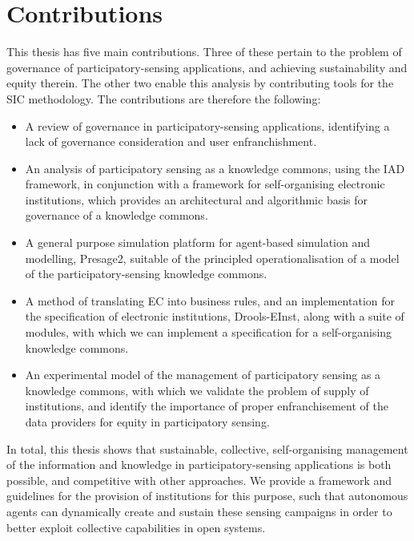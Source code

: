 \section{Contributions}

This thesis has five main contributions. Three of these pertain to the problem of governance of participatory-sensing applications, and achieving sustainability and equity therein. The other two enable this analysis by contributing tools for the \ac{SIC} methodology. The contributions are therefore the following:

\begin{itemize}
\item A review of governance in participatory-sensing applications, identifying a lack of governance consideration and user enfranchishment.
\item An analysis of participatory sensing as a knowledge commons, using the \ac{IAD} framework, in conjunction with a framework for self-organising electronic institutions, which provides an architectural and algorithmic basis for governance of a knowledge commons.
\item A general purpose simulation platform for agent-based simulation and modelling, Presage2, suitable of the principled operationalisation of a model of the participatory-sensing knowledge commons.
\item A method of translating \acl{EC} into business rules, and an implementation for the specification of electronic institutions, Drools-EInst, along with a suite of modules, with which we can implement a specification for a self-organising knowledge commons.
\item An experimental model of the management of participatory sensing as a knowledge commons, with which we validate the problem of supply of institutions, and identify the importance of proper enfranchisement of the data providers for equity in participatory sensing.
\end{itemize}

In total, this thesis shows that sustainable, collective, self-organising
management of the information and knowledge in participatory-sensing
applications is both possible, and competitive with other approaches. We
provide a framework and guidelines for the provision of institutions for this
purpose, such that autonomous agents can dynamically create and sustain these
sensing campaigns in order to better exploit collective capabilities in open
systems.
